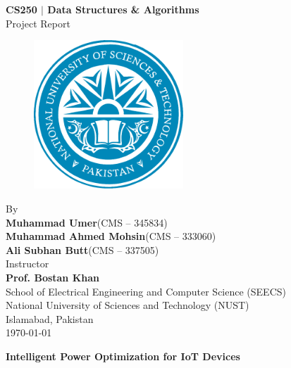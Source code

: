 \documentclass[11pt,a4paper]{article}
\begin{document}
\newpage
\begin{titlepage}
    \centering
    \vspace*{2pt}
    \huge{\textbf{CS250 $\mid$ Data Structures \& Algorithms}} \\
    \huge{Project Report} \\ [0.75cm]
    \begin{figure}[ht!]
        \centering
        \includegraphics[width=0.5\textwidth]{figs/nust.pdf}
    \end{figure}
    \vspace {0.75cm}
    \Large{By} \\
    \Large{\textbf{Muhammad Umer}\quad(CMS -- 345834)} \\
    \Large{\textbf{Muhammad Ahmed Mohsin}\quad(CMS -- 333060)} \\
    \Large{\textbf{Ali Subhan Butt}\quad(CMS -- 337505)} \\ [0.75cm]
 
    \Large{Instructor} \\ 
    \Large{\textbf{Prof. Bostan Khan}} \\ [0.75cm]
    \Large{School of Electrical Engineering and Computer Science (SEECS) \\
        National University of Sciences and Technology (NUST) \\
        Islamabad, Pakistan} \\ [0.75 cm]
    \Large{\today}
    \vspace{\fill} %
\end{titlepage}


\newpage
\setcounter{page}{1}

{\centering

\begin{LARGE}
\textbf{Intelligent Power Optimization for IoT Devices}
\end{LARGE}

\vspace{1em} %
}
\end{document}
